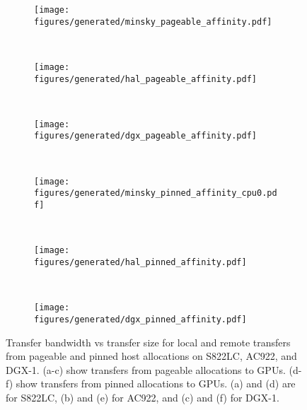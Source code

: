 \begin{figure}[ht]
    \centering
    \begin{subfigure}[b]{0.31\textwidth}
        \texttt{[image: figures/generated/minsky\_pageable\_affinity.pdf]}
        \caption{}
        \label{fig:minsky_pageable_affinity}
    \end{subfigure}
    ~
    \begin{subfigure}[b]{0.31\textwidth}
        \texttt{[image: figures/generated/hal\_pageable\_affinity.pdf]}
        \caption{}
        \label{fig:hal_pageable_affinity}
    \end{subfigure}
    ~
    \begin{subfigure}[b]{0.31\textwidth}
        \texttt{[image: figures/generated/dgx\_pageable\_affinity.pdf]}
        \caption{}
        \label{fig:dgx_pageable_affinity}
    \end{subfigure}
    \\
    \begin{subfigure}[b]{0.31\textwidth}
        \texttt{[image: figures/generated/minsky\_pinned\_affinity\_cpu0.pdf]}
        \caption{}
        \label{fig:minsky_pinned_affinity}
    \end{subfigure}
    ~
    \begin{subfigure}[b]{0.31\textwidth}
        \texttt{[image: figures/generated/hal\_pinned\_affinity.pdf]}
        \caption{}
        \label{fig:hal_pinned_affinity}
    \end{subfigure}
    ~
    \begin{subfigure}[b]{0.31\textwidth}
        \texttt{[image: figures/generated/dgx\_pinned\_affinity.pdf]}
        \caption{}
        \label{fig:dgx_pinned_affinity}

    \end{subfigure}
    \caption[]{
    Transfer bandwidth vs transfer size for local and remote transfers from pageable and pinned host allocations on S822LC, AC922, and DGX-1.
    (a-c) show transfers from pageable allocations to GPUs.
    (d-f) show transfers from pinned allocations to GPUs.
    (a) and (d) are for S822LC, (b) and (e) for AC922, and (c) and (f) for DGX-1.
    }
    \label{fig:cpu-gpu-affinity-direction}
\end{figure}



